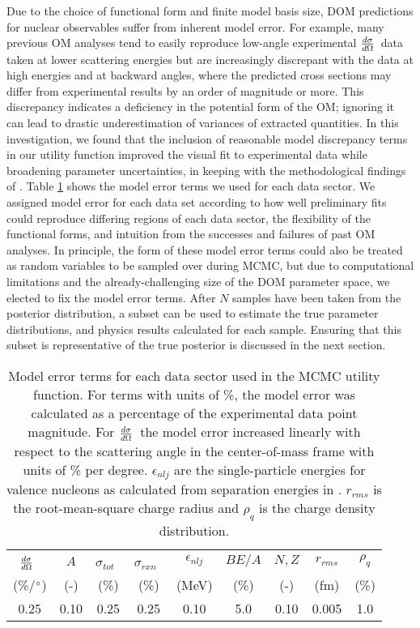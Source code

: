\documentclass[twocolumn,secnumarabic,amssymb, nobibnotes, aps, prl,
superscriptaddress, nobalancelastpage, floatfix]{revtex4}
\newcommand{\tot}{\ensuremath{\sigma_{tot}}}
\newcommand{\rxn}{\ensuremath{\sigma_{rxn}}}
\newcommand{\el}{\ensuremath{\frac{\lowercase{d}\sigma}{\lowercase{d}\Omega}}}
\begin{document}
Due to the choice of functional form and finite model basis size,
DOM predictions for nuclear observables suffer from inherent model error.
For example, many previous OM analyses tend to easily reproduce low-angle
experimental \el\ data taken at
lower scattering energies but are increasingly discrepant with the data
at high energies and at backward angles, where the predicted cross sections may
differ from experimental results by an order of magnitude or more. This discrepancy indicates a
deficiency in the potential form of the OM; ignoring it can
lead to drastic underestimation of variances of extracted
quantities. In this investigation, we found that the inclusion of reasonable model
discrepancy terms in our utility function improved the visual fit to experimental data while
broadening parameter uncertainties, in keeping with the methodological
findings of \cite{Brynjarsdottir2014}. Table \ref{ModelDiscrepancyTable} shows the model error terms we used 
for each data sector. We assigned model error for each data set
according to how well preliminary fits could reproduce differing regions of each
data sector, the flexibility of the functional forms, and intuition
from the successes and failures of past OM analyses.
In principle, the form of these model error terms could also be treated as random
variables to be sampled over during MCMC, but due to computational limitations and the
already-challenging size of the DOM parameter space, we elected to fix the model error terms.
After $N$ samples have been taken from the posterior distribution,
a subset can be used to estimate the true parameter distributions,
and physics results calculated for each sample. Ensuring that this subset is
representative of the true posterior is discussed in the next section.
\begin{table}[tb]
    \centering
    \caption{Model error terms for each data sector used in the
        MCMC utility function. For terms with units of \%, the
        model error was calculated as a percentage of the experimental data point magnitude.
        For \el\, the model error increased
        linearly with respect to the scattering angle in the
        center-of-mass frame with units of \% per degree. 
        $\epsilon_{nlj}$ are the single-particle energies for valence nucleons as calculated
        from separation energies in \cite{AME2016}.
        $r_{rms}$ is the root-mean-square charge radius and
        $\rho_{q}$ is the charge density distribution.}
    \renewcommand{\arraystretch}{1.2}
    \begin{tabular}{ c c c c c c c c c}
        \el\ & $A$ & \tot\ & \rxn\ & $\epsilon_{nlj}$ & $BE/A$ & $N,Z$ & $r_{rms}$ & $\rho_{q}$ \\ \relax
        (\%/$\degree$) & (-) & (\%) & (\%) & (MeV) & (\%) & (-) & (fm) & (\%) \\
        \hline
        0.25 & 0.10 & 0.25 & 0.25 & 0.10 & 5.0 & 0.10 & 0.005 & 1.0 \\
    \end{tabular}
        \label{ModelDiscrepancyTable}
\end{table}
\end{document}
